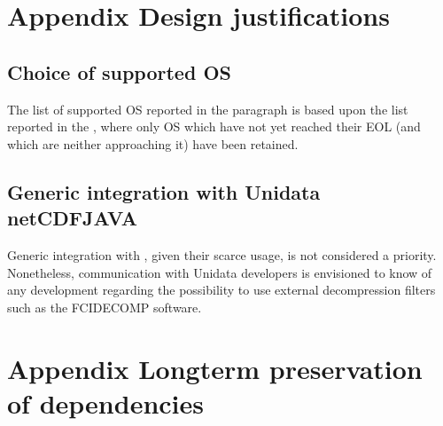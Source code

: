 \documentclass[a4paper,10pt,english]{sphinxmanual}
\begin{document}
\chapter{Appendix \sphinxhyphen{} Design justifications}
\label{\detokenize{a_design_justifications:appendix-design-justifications}}\label{\detokenize{a_design_justifications:design-justifications}}\label{\detokenize{a_design_justifications::doc}}

\section{Choice of supported OS}
\label{\detokenize{a_design_justifications:choice-of-supported-os}}
\sphinxAtStartPar
The list of supported OS reported in the {\hyperref[\detokenize{packaging_and_deployment:supported-platforms}]{}} paragraph is based upon the list reported
in the {\hyperref[\detokenize{introduction:eumetcast-os-spec}]{}}, where only OS which have not yet
reached their EOL (and which are neither approaching it) have been retained.


\section{Generic integration with Unidata netCDF\sphinxhyphen{}JAVA}
\label{\detokenize{a_design_justifications:generic-integration-with-unidata-netcdf-java}}
\sphinxAtStartPar
{}

\sphinxAtStartPar
Generic integration with {\hyperref[\detokenize{introduction:netcdf-java}]{}}, given their scarce usage, is not
considered a priority. Nonetheless, communication with Unidata developers is envisioned to know of any development
regarding the possibility to use external decompression filters such as the FCIDECOMP software.


\chapter{Appendix \sphinxhyphen{} Long\sphinxhyphen{}term preservation of dependencies}
\label{\detokenize{a_preservation_of_dependencies:appendix-long-term-preservation-of-dependencies}}\label{\detokenize{a_preservation_of_dependencies::doc}}
\sphinxAtStartPar
{}
\end{document}
